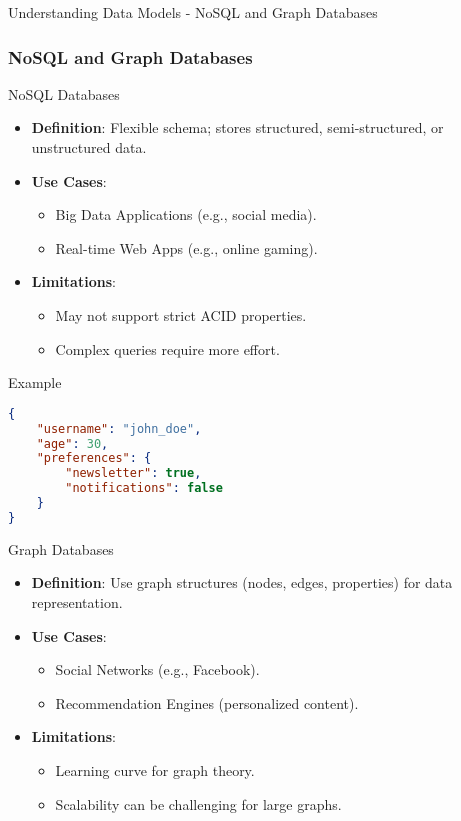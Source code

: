 \documentclass[aspectratio=169]{beamer}
\begin{document}
\begin{frame}[fragile]{Understanding Data Models - NoSQL and Graph Databases}
    \frametitle{NoSQL and Graph Databases}

    \begin{block}{NoSQL Databases}
        \begin{itemize}
            \item \textbf{Definition}: Flexible schema; stores structured, semi-structured, or unstructured data.
            \item \textbf{Use Cases}:
                \begin{itemize}
                    \item Big Data Applications (e.g., social media).
                    \item Real-time Web Apps (e.g., online gaming).
                \end{itemize}
            \item \textbf{Limitations}:
                \begin{itemize}
                    \item May not support strict ACID properties.
                    \item Complex queries require more effort.
                \end{itemize}
        \end{itemize}
        
        \begin{block}{Example}
            \begin{lstlisting}[language=json]
{
    "username": "john_doe",
    "age": 30,
    "preferences": {
        "newsletter": true,
        "notifications": false
    }
}
            \end{lstlisting}
        \end{block}
    \end{block}

    \begin{block}{Graph Databases}
        \begin{itemize}
            \item \textbf{Definition}: Use graph structures (nodes, edges, properties) for data representation.
            \item \textbf{Use Cases}:
                \begin{itemize}
                    \item Social Networks (e.g., Facebook).
                    \item Recommendation Engines (personalized content).
                \end{itemize}
            \item \textbf{Limitations}:
                \begin{itemize}
                    \item Learning curve for graph theory.
                    \item Scalability can be challenging for large graphs.
                \end{itemize}
        \end{itemize}
        

\end{block}
\end{frame}
\end{document}
